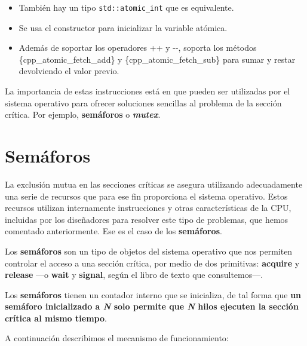 \begin{itemize}
\item
  También hay un tipo \texttt{std::atomic\_int} que es equivalente.
\item
  Se usa el constructor para inicializar la variable atómica.
\item
  Además de soportar los operadores \textquotesingle++\textquotesingle{}
  y \textquotesingle-\/-\textquotesingle, soporta los métodos
  \{cpp\_atomic\_fetch\_add\} y \{cpp\_atomic\_fetch\_sub\} para sumar y
  restar devolviendo el valor previo.
\end{itemize}

La importancia de estas instrucciones está en que pueden ser utilizadas
por el sistema operativo para ofrecer soluciones sencillas al problema
de la sección crítica. Por ejemplo, \textbf{semáforos} o
\textbf{\emph{mutex}}.

\section{Semáforos}\label{_semuxe1foros}

{} La exclusión mutua en las secciones críticas se asegura utilizando
adecuadamente una serie de recursos que para ese fin proporciona el
sistema operativo. Estos recursos utilizan internamente instrucciones y
otras características de la CPU, incluidas por los diseñadores para
resolver este tipo de problemas, que hemos comentado anteriormente. Ese
es el caso de los \textbf{semáforos}.

Los \textbf{semáforos} son un tipo de objetos del sistema operativo que
nos permiten controlar el acceso a una sección crítica, por medio de dos
primitivas: \textbf{acquire} y \textbf{release} ---o \textbf{wait} y
\textbf{signal}, según el libro de texto que consultemos---.

Los \textbf{semáforos} tienen un contador interno que se inicializa, de
tal forma que \textbf{un semáforo inicializado a \emph{N} solo permite
que \emph{N} hilos ejecuten la sección crítica al mismo tiempo}.

A continuación describimos el mecanismo de funcionamiento:

\begin{Shaded}
\begin{Highlighting}[]
\OperatorTok{(}\OperatorTok{);}    

\OperatorTok{()}         


\OperatorTok{();}         
\end{Highlighting}
\end{Shaded}

